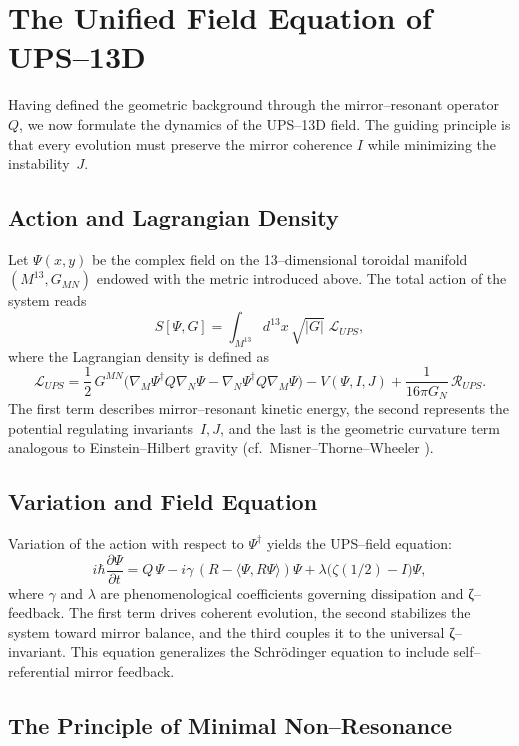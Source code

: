 
\section{The Unified Field Equation of UPS--13D}

Having defined the geometric background through the mirror--resonant
operator~$Q$, we now formulate the dynamics of the UPS--13D field.
The guiding principle is that every evolution must preserve
the mirror coherence $I$ while minimizing the instability~$J$.

\subsection{Action and Lagrangian Density}

Let $\Psi(x,y)$ be the complex field on the 13--dimensional toroidal
manifold $(M^{13},G_{MN})$ endowed with the metric introduced above.
The total action of the system reads
\[
S[\Psi,G] =
\int_{M^{13}}\! d^{13}x\,\sqrt{|G|}\;
\mathcal{L}_{UPS},
\]
where the Lagrangian density is defined as
\[
\mathcal{L}_{UPS}
 = \frac{1}{2}\,G^{MN}
   \big(\nabla_M \Psi^{\dagger} Q \nabla_N \Psi
      - \nabla_N \Psi^{\dagger} Q \nabla_M \Psi \big)
   - V(\Psi,I,J)
   + \frac{1}{16\pi G_N} \, \mathcal{R}_{UPS}.
\]
The first term describes mirror--resonant kinetic energy,
the second represents the potential regulating invariants~$I,J$,
and the last is the geometric curvature term
analogous to Einstein--Hilbert gravity
(cf.\ Misner--Thorne--Wheeler \cite{MTW1973}).

\subsection{Variation and Field Equation}

Variation of the action with respect to $\Psi^{\dagger}$
yields the UPS--field equation:
\[
i\hbar \frac{\partial \Psi}{\partial t}
  = Q\,\Psi
    - i\gamma\,(R - \langle\Psi,R\Psi\rangle)\Psi
    + \lambda\big(\zeta(1/2) - I\big)\Psi,
\]
where $\gamma$ and $\lambda$ are phenomenological coefficients
governing dissipation and ζ--feedback.
The first term drives coherent evolution,
the second stabilizes the system toward mirror balance,
and the third couples it to the universal ζ--invariant.
This equation generalizes the Schrödinger equation
to include self--referential mirror feedback.

\subsection{The Principle of Minimal Non--Resonance}

